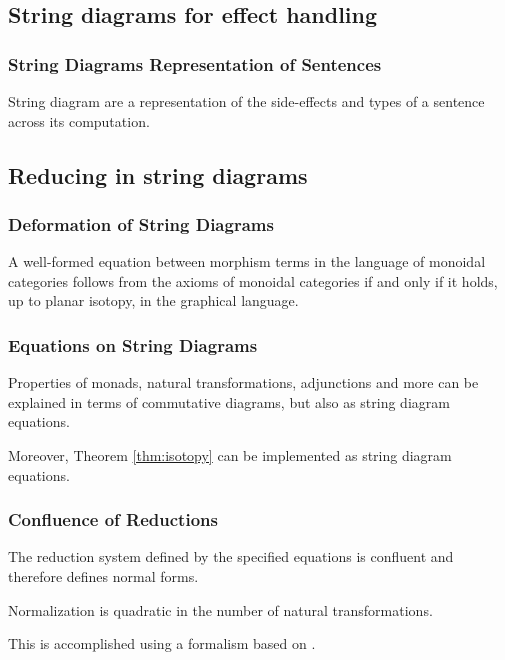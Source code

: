 \documentclass[math, english, info]{beamercours}
\begin{document}
\subsection{String diagrams for effect handling}
\begin{frame}
	\frametitle{String Diagrams Representation of Sentences}
	String diagram are a representation of the side-effects and types of a
	sentence across its computation.
	\begin{center}
	\end{center}

\end{frame}

\subsection{Reducing in string diagrams}
\begin{frame}
	\frametitle{Deformation of String Diagrams}
	\begin{thm}
		\label{thm:isotopy}
		A well-formed equation between morphism terms in the language of monoidal
		categories follows from the axioms of monoidal categories if and only if it
		holds, up to planar isotopy, in the graphical language.
	\end{thm}
\end{frame}

\begin{frame}
	\frametitle{Equations on String Diagrams}
	Properties of monads, natural transformations, adjunctions
	and more can be explained in terms of commutative diagrams, but also as
	string diagram equations.

	Moreover, Theorem \ref{thm:isotopy} can be implemented as string diagram
	equations.
\end{frame}

\begin{frame}
	\frametitle{Confluence of Reductions}
	\begin{thm}[Confluence]\label{thm:confluence}
		The reduction system defined by the specified equations is confluent and
		therefore defines normal forms.
	\end{thm}

	\smallskip

	\begin{thm}
		\label{thm:normalize}
		Normalization is quadratic in the number of natural transformations.
	\end{thm}
	This is accomplished using a formalism based on \cite{delpeuchNormalizationPlanarString2022}.
\end{frame}
\end{document}
